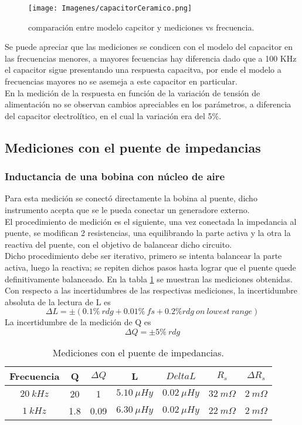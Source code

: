 \documentclass[a4paper,10pt]{article}
\begin{document}
		\begin{figure}[!htb]
			\centering
			\texttt{[image: Imagenes/capacitorCeramico.png]}
			\caption{comparación entre modelo capcitor y mediciones vs 
			frecuencia.}
			\label{img:004} 
		\end{figure}

		\indent Se puede apreciar que las mediciones se condicen con el modelo 
		del capacitor en las frecuencias menores, a mayores fecuencias hay 
		diferencia dado que a 100 KHz el capacitor sigue presentando una 
		respuesta capacitva, por ende el modelo a frecuencias mayores no 
		se asemeja a este capacitor en particular. \\
		\indent En la medición de la respuesta en función de la variación de 
		tensión de alimentación no se observan cambios apreciables en los 
		parámetros, a diferencia del capacitor electrolítico, en el cual la 
		variación era del 5\%.
	
	\subsection{Mediciones con el puente de impedancias}
		\subsubsection{Inductancia de una bobina con n\'ucleo de aire}
		\indent Para esta medición se conectó directamente la bobina al puente, 
		dicho instrumento acepta que se le pueda conectar un generadore externo.
		\\
		\indent El procedimiento de medición es el siguiente, una vez conectada
		la impedancia al puente, se modifican 2 resistencias, una equilibrando
		la parte activa y la otra la reactiva del puente, con el objetivo de 
		balancear dicho circuito. \\
		\indent Dicho procedimiento debe ser iterativo, primero se intenta 
		balancear la parte activa, luego la reactiva; se repiten dichos pasos
		hasta lograr que el puente quede definitivamente balanceado. En la 
		tabla \ref{tabPUENTEbobina} se muestran las mediciones obtenidas. \\
		\indent Con respecto a las incertidumbres de las respectivas mediciones,
		la incertidumbre absoluta de la lectura de L es 
		$$\Delta L = \pm (0.1\%~rdg +0.01\%~fs +0.2\%rdg~on~lowest~range)$$
		\indent La incertidumbre de la medición de Q es 
		$$\Delta Q = \pm5\%~rdg$$

		\begin{table}[!htp]
			\centering
			\begin{tabular}{|c|c|c|c|c|c|c|}
				\hline
				Frecuencia & Q & $\Delta Q$ & L & $Delta L$  & $R_s$ & 
				$\Delta R_s $ \\
				\hline
				$20~kHz$& 20 & 1 & $5.10~\mu Hy$ & $0.02~\mu Hy$ & 
				$ 32~m\Omega$ & $2~m\Omega$\\
				\hline
				$1~kHz$& 1.8 & 0.09 & $6.30~\mu Hy$ & $0.02~\mu Hy$ & 
				$ 22~m\Omega$ & $2~m\Omega$\\
				\hline	  
			\end{tabular}
			\caption{Mediciones con el puente de impedancias.} 
			\label{tabPUENTEbobina}
		\end{table}	
		
\end{document}
